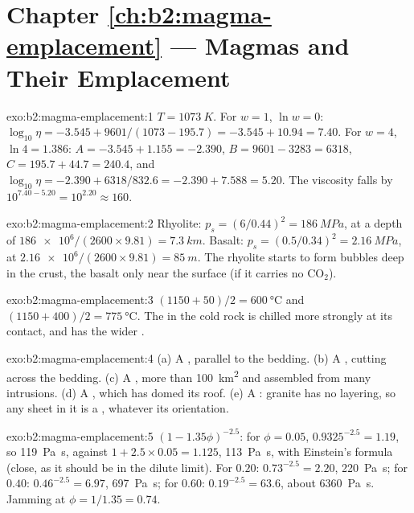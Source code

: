 \section*{Chapter \ref{ch:b2:magma-emplacement} --- Magmas and Their Emplacement}

\begin{solution}{exo:b2:magma-emplacement:1}
$T = \qty{1073}{K}$. For $w = 1$, $\ln w = 0$: $\log_{10}\eta = -3.545 +
9601/(1073 - 195.7) = -3.545 + 10.94 = 7.40$. For $w = 4$, $\ln 4 = 1.386$:
$A = -3.545 + 1.155 = -2.390$, $B = 9601 - 3283 = 6318$, $C = 195.7 + 44.7 =
240.4$, and $\log_{10}\eta = -2.390 + 6318/832.6 = -2.390 + 7.588 = 5.20$. The
viscosity falls by $10^{7.40 - 5.20} = 10^{2.20} \approx 160$.
\end{solution}

\begin{solution}{exo:b2:magma-emplacement:2}
Rhyolite: $p_s = (6/0.44)^2 = \qty{186}{MPa}$, at a depth of $\num{186e6}/(2600\times9.81)
= \qty{7.3}{km}$. Basalt: $p_s = (0.5/0.34)^2 = \qty{2.16}{MPa}$, at
$\num{2.16e6}/(2600\times9.81) = \qty{85}{m}$. The rhyolite starts to form bubbles
deep in the crust, the basalt only near the surface (if it carries no CO$_2$).
\end{solution}

\begin{solution}{exo:b2:magma-emplacement:3}
$(1150 + 50)/2 = \qty{600}{\celsius}$ and $(1150 + 400)/2 = \qty{775}{\celsius}$. The
 in the cold rock is chilled more strongly at its contact, and has the wider
.
\end{solution}

\begin{solution}{exo:b2:magma-emplacement:4}
(a) A , parallel to the bedding. (b) A , cutting across the bedding.
(c) A , more than \qty{100}{km^2} and assembled from many intrusions.
(d) A , which has domed its roof. (e) A : granite has no layering,
so any sheet in it is a , whatever its orientation.
\end{solution}

\begin{solution}{exo:b2:magma-emplacement:5}
$(1 - 1.35\phi)^{-2.5}$: for $\phi = 0.05$, $0.9325^{-2.5} = 1.19$, so
\qty{119}{Pa.s}, against $1 + 2.5\times0.05 = 1.125$, \qty{113}{Pa.s}, with Einstein's
formula (close, as it should be in the dilute limit). For $0.20$: $0.73^{-2.5} =
2.20$, \qty{220}{Pa.s}; for $0.40$: $0.46^{-2.5} = 6.97$, \qty{697}{Pa.s}; for $0.60$:
$0.19^{-2.5} = 63.6$, about \qty{6360}{Pa.s}. Jamming at $\phi = 1/1.35 = 0.74$.
\end{solution}

